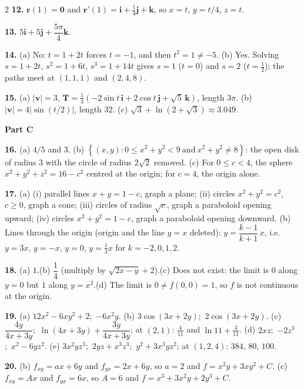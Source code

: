 \documentclass[11pt,oneside]{article}
\newcommand{\bi}{\mathbf{i}}
\newcommand{\bj}{\mathbf{j}}
\newcommand{\bk}{\mathbf{k}}
\newcommand{\br}{\mathbf{r}}
\newcommand{\bv}{\mathbf{v}}
\newcommand{\bT}{\mathbf{T}}
\begin{document}
{\begin{multicols}{2}
\textbf{12.} $\br(1)=\mathbf{0}$ and $\br'(1)=\bi+\tfrac14\bj+\bk$, so
$x=t$, $y=t/4$, $z=t$.

\textbf{13.} $5\bi+5\bj+\dfrac{5\pi}{4}\bk$.

\textbf{14.} (a) No: $t=1+2t$ forces $t=-1$, and then $t^{2}=1\neq-5$.\quad
(b) Yes. Solving $s=1+2t$, $s^{2}=1+6t$, $s^{3}=1+14t$ gives $s=1$ ($t=0$) and $s=2$
($t=\tfrac12$); the paths meet at $(1,1,1)$ and $(2,4,8)$.

\textbf{15.} (a) $|\bv|=3$, $\bT=\tfrac{1}{3}\left(-2\sin t\,\bi+2\cos t\,\bj+\sqrt{5}\,\bk\right)$,
length $3\pi$.\quad
(b) $|\bv|=4\left|\sin(t/2)\right|$, length $32$.\quad
(c) $\sqrt{3}+\ln\!\left(2+\sqrt{3}\right)\approx3.049$.

\vspace{4pt}
\textbf{Part C}\par\vspace{2pt}

\textbf{16.} (a) $4/5$ and $3$.\quad
(b) $\left\{(x,y):0\le x^{2}+y^{2}<9\ \text{and}\ x^{2}+y^{2}\neq8\right\}$: the open disk of
radius $3$ with the circle of radius $2\sqrt{2}$ removed.\quad
(c) For $0\le c<4$, the sphere $x^{2}+y^{2}+z^{2}=16-c^{2}$ centred at the origin; for $c=4$,
the origin alone.

\textbf{17.} (a) (i) parallel lines $x+y=1-c$, graph a plane; (ii) circles $x^{2}+y^{2}=c^{2}$,
$c\ge0$, graph a cone; (iii) circles of radius $\sqrt{c}$, graph a paraboloid opening upward;
(iv) circles $x^{2}+y^{2}=1-c$, graph a paraboloid opening downward.\quad
(b) Lines through the origin (origin and the line $y=x$ deleted):
$y=\dfrac{k-1}{k+1}\,x$, i.e. $y=3x$, $y=-x$, $y=0$, $y=\tfrac13x$ for $k=-2,0,1,2$.

\textbf{18.} (a) $1$.\quad (b) $\dfrac14$ (multiply by
$\sqrt{2x-y}+2$).\quad (c) Does not exist: the limit is $0$ along $y=0$ but $1$ along
$y=x^{2}$.\quad (d) The limit is $0\neq f(0,0)=1$, so $f$ is not continuous at the origin.

\textbf{19.} (a) $12x^{2}-6xy^{2}+2$;\ $-6x^{2}y$.\quad
(b) $3\cos(3x+2y)$;\ $2\cos(3x+2y)$.\quad
(c) $\dfrac{4y}{4x+3y}$;\ $\ln(4x+3y)+\dfrac{3y}{4x+3y}$; at $(2,1)$: $\tfrac{4}{11}$ and
$\ln11+\tfrac{3}{11}$.\quad
(d) $2xz$;\ $-2z^{3}$;\ $x^{2}-6yz^{2}$.\quad
(e) $3x^{2}yz^{3}$;\ $2yz+x^{3}z^{3}$;\ $y^{2}+3x^{3}yz^{2}$; at $(1,2,4)$: $384$, $80$, $100$.

\textbf{20.} (b) $f_{xy}=ax+6y$ and $f_{yx}=2x+6y$, so $a=2$ and $f=x^{2}y+3xy^{2}+C$.\quad
(c) $f_{xy}=Ax$ and $f_{yx}=6x$, so $A=6$ and $f=x^{3}+3x^{2}y+2y^{3}+C$.


\end{multicols}}
\end{document}
